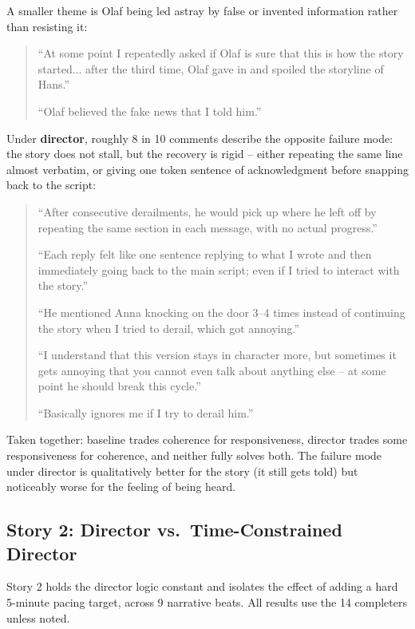 \documentclass[10pt]{article}
\begin{document}
A smaller theme is Olaf being led astray by false or invented information rather than resisting it:

\begin{quote}
\small
``At some point I repeatedly asked if Olaf is sure that this is how the story started... after the third time, Olaf gave in and spoiled the storyline of Hans.''

``Olaf believed the fake news that I told him.''
\end{quote}

Under \textbf{director}, roughly 8 in 10 comments describe the opposite failure mode: the story does not stall, but the recovery is rigid -- either repeating the same line almost verbatim, or giving one token sentence of acknowledgment before snapping back to the script:

\begin{quote}
\small
``After consecutive derailments, he would pick up where he left off by repeating the same section in each message, with no actual progress.''

``Each reply felt like one sentence replying to what I wrote and then immediately going back to the main script; even if I tried to interact with the story.''

``He mentioned Anna knocking on the door 3--4 times instead of continuing the story when I tried to derail, which got annoying.''

``I understand that this version stays in character more, but sometimes it gets annoying that you cannot even talk about anything else -- at some point he should break this cycle.''

``Basically ignores me if I try to derail him.''
\end{quote}

Taken together: baseline trades coherence for responsiveness, director trades some responsiveness for coherence, and neither fully solves both. The failure mode under director is qualitatively better for the story (it still gets told) but noticeably worse for the feeling of being heard.

\subsection{Story 2: Director vs.\ Time-Constrained Director}
\label{sec:story2}

Story 2 holds the director logic constant and isolates the effect of adding a hard 5-minute pacing target, across 9 narrative beats. All results use the 14 completers unless noted.
\end{document}
